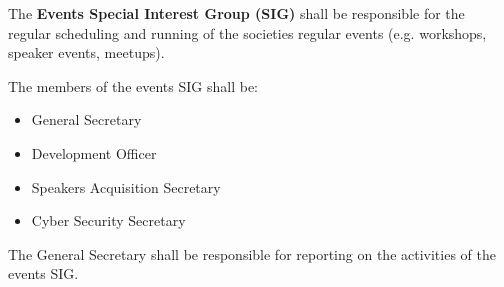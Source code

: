 \begin{clause}
    The \textbf{Events Special Interest Group (SIG)} shall be responsible for the regular scheduling and running of the societies regular events (e.g. workshops, speaker events, meetups).
\end{clause}

\begin{subclause}
    The members of the events SIG shall be:
    \begin{itemize}[label=--,topsep=0em,itemsep=0em]
        \item General Secretary
        \item Development Officer
        \item Speakers Acquisition Secretary
        \item Cyber Security Secretary
    \end{itemize}
\end{subclause}

\begin{subclause}
    The General Secretary shall be responsible for reporting on the activities of the events SIG.
\end{subclause}